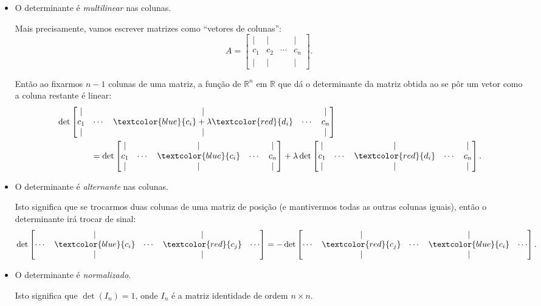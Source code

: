 \begin{itemize}
	\item O determinante é \textit{multilinear} nas colunas.
	
	Mais precisamente, vamos escrever matrizes como ``vetores de colunas'':
	\[A=\begin{bmatrix}|&|&&|\\c_1&c_2&\cdots&c_n\\|&|&&|\end{bmatrix}.\]
	
	Então ao fixarmos $n-1$ colunas de uma matriz, a função de $\mathbb{R}^n$ em $\mathbb{R}$ que dá o determinante da matriz obtida ao se pôr um vetor como a coluna restante é linear:
	\begin{align*}
	&\det\begin{bmatrix}|&&|&&|\\c_1&\cdots&\textcolor{blue}{c_i}+\lambda \textcolor{red}{d_i}&\cdots&c_n\\|&&|&&|\end{bmatrix}\\
	&\qquad\qquad=\det\begin{bmatrix}|&&|&&|\\c_1&\cdots&\textcolor{blue}{c_i}&\cdots&c_n\\|&&|&&|\end{bmatrix}+\lambda \det\begin{bmatrix}|&&|&&|\\c_1&\cdots&\textcolor{red}{d_i}&\cdots&c_n\\|&&|&&|\end{bmatrix}.\end{align*}
	
	\item O determinante é \textit{alternante} nas colunas.
	
	Isto significa que se trocarmos duas colunas de uma matriz de posição (e mantivermos todas as outras colunas iguais), então o determinante irá trocar de sinal:
	\[\det\begin{bmatrix}&|&&|&\\
	\cdots &\textcolor{blue}{c_i}&\cdots&\textcolor{red}{c_j}&\cdots\\&|&&|&\end{bmatrix}=-\det\begin{bmatrix}&|&&|&\\
	\cdots&\textcolor{red}{c_j}&\cdots&\textcolor{blue}{c_i}&\cdots\\&|&&|&\end{bmatrix}.\]
	
	\item O determinante é \textit{normalizado}.

		Isto significa que $\det(I_n)=1$, onde $I_n$ é a matriz identidade de ordem $n\times n$.
\end{itemize}

